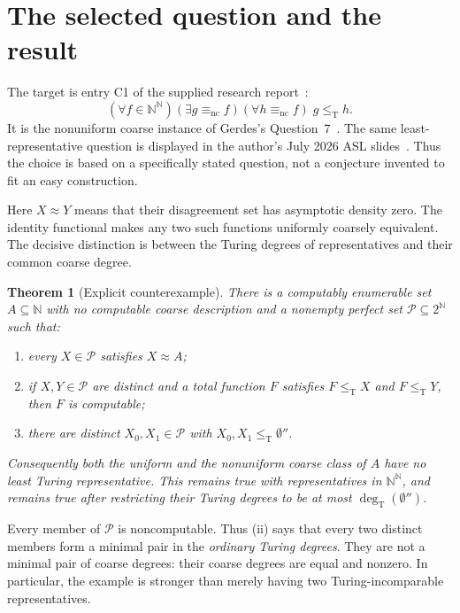 \documentclass[11pt,a4paper]{article}
\newcommand{\N}{\mathbb N}
\newcommand{\Cantor}{2^{\N}}
\newcommand{\Baire}{\N^{\N}}
\newcommand{\leT}{\leq_{\mathrm T}}
\newcommand{\degT}{\operatorname{deg}_{\mathrm T}}
\newcommand{\nc}{\mathrm{nc}}
\newtheorem{theorem}{Theorem}[section]
\theoremstyle{definition}
\theoremstyle{remark}
\begin{document}
\section{The selected question and the result}\label{sec:results}
The target is entry C1 of the supplied research report~\cite{Survey}:
\begin{equation}\label{eq:question}
 (\forall f\in\Baire)(\exists g\equiv_{\nc}f)
 (\forall h\equiv_{\nc}f)\;g\leT h.
\end{equation}
It is the nonuniform coarse instance of Gerdes's Question~7~\cite{Gerdes}.
The same least-representative question is displayed in the author's July 2026
ASL slides~\cite{GerdesSlides}. Thus the choice is based on a specifically
stated question, not a conjecture invented to fit an easy construction.

Here $X\approx Y$ means that their disagreement set has asymptotic density
zero. The identity functional makes any two such functions uniformly coarsely
equivalent. The decisive distinction is between the Turing degrees of
representatives and their common coarse degree.

\begin{theorem}[Explicit counterexample]\label{thm:main}
There is a computably enumerable set $A\subseteq\N$ with no computable coarse
description and a nonempty perfect set $\mathcal P\subseteq\Cantor$ such that:
\begin{enumerate}[label=\textup{(\roman*)}]
\item every $X\in\mathcal P$ satisfies $X\approx A$;
\item if $X,Y\in\mathcal P$ are distinct and a total function $F$ satisfies
$F\leT X$ and $F\leT Y$, then $F$ is computable;
\item there are distinct $X_0,X_1\in\mathcal P$ with $X_0,X_1\leT\emptyset''$.
\end{enumerate}
Consequently both the uniform and the nonuniform coarse class of $A$ have no
least Turing representative. This remains true with representatives in
$\Baire$, and remains true after restricting their Turing degrees to be at
most $\degT(\emptyset'')$.
\end{theorem}

Every member of $\mathcal P$ is noncomputable. Thus (ii) says that every two
distinct members form a minimal pair in the \emph{ordinary Turing degrees}.
They are not a minimal pair of coarse degrees: their coarse degrees are equal
and nonzero. In particular, the example is stronger than merely having two
Turing-incomparable representatives.
\end{document}
